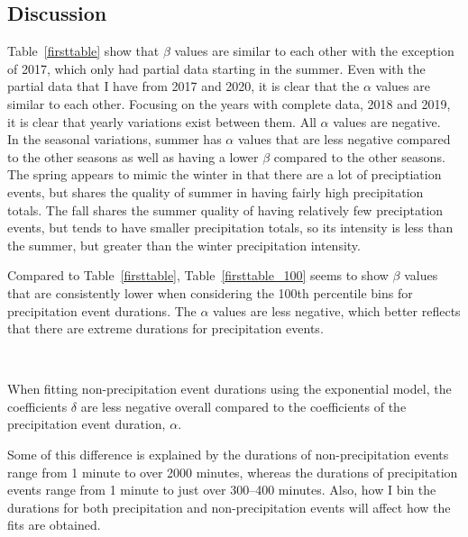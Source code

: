 \documentclass[11pt]{report}
\begin{document}
\clearpage

\subsection{Discussion}\label{sec:apcd}

Table~\ref{firsttable} show that $\beta$ values are similar to each other
with the exception of 2017, which only had partial data starting in the
summer. Even with the partial data that I have from 2017 and 2020, it is
clear that the $\alpha$ values are similar to each other. Focusing on the
years with complete data, 2018 and 2019, it is clear that yearly variations
exist between them. All $\alpha$ values are negative.\\[-1.5em]





In the seasonal variations, summer has $\alpha$ values that are
less negative compared to the other seasons as well as having a lower
$\beta$ compared to the other seasons.  The spring appears to mimic the
winter in that there are a lot of preciptiation events, but shares the
quality of summer in having fairly high precipitation totals. The fall
shares the summer quality of having relatively few preciptation events, but
tends to have smaller precipitation totals, so its intensity is less than
the summer, but greater than the winter precipitation intensity.

Compared to Table~\ref{firsttable}, Table~\ref{firsttable_100} seems to show
$\beta$ values that are consistently lower when considering the 100th
percentile bins for precipitation event durations. The $\alpha$ values are
less negative, which better reflects that there are extreme durations
for precipitation events.

\ 





When fitting non-precipitation event durations using the exponential model,
the coefficients $\delta$ are less negative overall compared to the
coefficients of the precipitation event duration, $\alpha$.

Some of this difference is explained by the durations of
non-precipitation events range from 1 minute to over 2000 minutes, whereas
the durations of precipitation events range from 1 minute to just over
300--400 minutes. Also, how I bin the durations for both precipitation and
non-precipitation events will affect how the fits are obtained.
\end{document}
